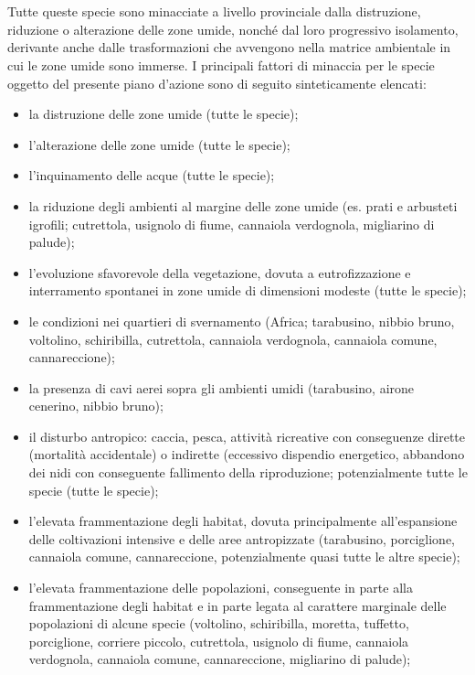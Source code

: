 \documentclass[10pt,twoside,openany,x11names,svgnames,italian,a5paper,dvipsnames,table]{memoir}
\begin{document}
\section*{}
Tutte queste specie sono minacciate a livello provinciale dalla distruzione, riduzione o alterazione delle zone umide, nonché dal loro progressivo isolamento, derivante anche dalle trasformazioni che avvengono nella matrice ambientale in cui le zone umide sono immerse.
I principali fattori di minaccia per le specie oggetto del presente piano d'azione sono di seguito sinteticamente elencati:
\begin{itemize}\itemsep0pt
  \item la distruzione delle zone umide (tutte le specie);
  \item l'alterazione delle zone umide (tutte le specie);
  \item l'inquinamento delle acque (tutte le specie);
  \item la riduzione degli ambienti al margine delle zone umide (es. prati e arbusteti igrofili; cutrettola, usignolo di fiume, cannaiola verdognola, migliarino di palude);
  \item l'evoluzione sfavorevole della vegetazione, dovuta a eutrofizzazione e interramento spontanei in zone umide di dimensioni modeste (tutte le specie);
  \item le condizioni nei quartieri di svernamento (Africa; tarabusino, nibbio bruno, voltolino, schiribilla, cutrettola, cannaiola verdognola, cannaiola comune, cannareccione);
  \item la presenza di cavi aerei sopra gli ambienti umidi (tarabusino, airone cenerino, nibbio bruno);
  \item il disturbo antropico: caccia, pesca, attività ricreative con conseguenze dirette (mortalità accidentale) o indirette (eccessivo dispendio energetico, abbandono dei nidi con conseguente fallimento della riproduzione; potenzialmente tutte le specie (tutte le specie);
  \item l'elevata frammentazione degli habitat, dovuta principalmente all'espansione delle coltivazioni intensive e delle aree antropizzate (tarabusino, porciglione, cannaiola comune, cannareccione, potenzialmente quasi tutte le altre specie);
  \item l'elevata frammentazione delle popolazioni, conseguente in parte alla frammentazione degli habitat e in parte legata al carattere marginale delle popolazioni di alcune specie (voltolino, schiribilla, moretta, tuffetto, porciglione, corriere piccolo, cutrettola, usignolo di fiume, cannaiola verdognola, cannaiola comune, cannareccione, migliarino di palude);

\end{itemize}
\end{document}
